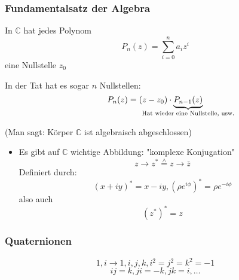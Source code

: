 \documentclass[a4paper]{scrartcl}
\newcommand{\estimates}{\overset{\scriptscriptstyle\wedge}{=}}
\theoremstyle{definition}
\theoremstyle{plain}
\theoremstyle{remark}
\theoremstyle{remark}
\newcommand{\I}{\ensuremath{i}}%
\begin{document}
\subsubsection{Fundamentalsatz der Algebra}
\label{sec-5-1-5}
In $\mathbb{C}$ hat jedes Polynom
\[P_n(z) = \sum_{i = 0}^n a_i z^i\]
eine Nullstelle $z_0$

In der Tat hat es sogar $n$ Nullstellen:
\[P_n(z) = (z - z_0)\cdot \underbrace{P_{n - 1}(z)}_{\mathclap{\text{Hat wieder eine Nullstelle, usw.}}}\]

(Man sagt: Körper $\mathbb{C}$ ist algebraisch abgeschlossen)
\begin{itemize}
\item Es gibt auf $\mathbb{C}$ wichtige Abbildung: "komplexe Konjugation"
\[z \to z^\ast \estimates z\to \bar z\]
Definiert durch:
\[(x + \I y)^\ast = x - \I y, (\rho e^{\I \phi})^\ast = \rho e^{-\I \phi}\]
also auch
\[(z^\ast)^\ast = z\]
\end{itemize}
\subsubsection{Quaternionen}
\label{sec-5-1-6}
\[1,i \to 1,i,j,k, i^2 = j^2 = k^2 = -1\]
\[ij = k, j i = -k, jk = i,\ldots\]
\end{document}
